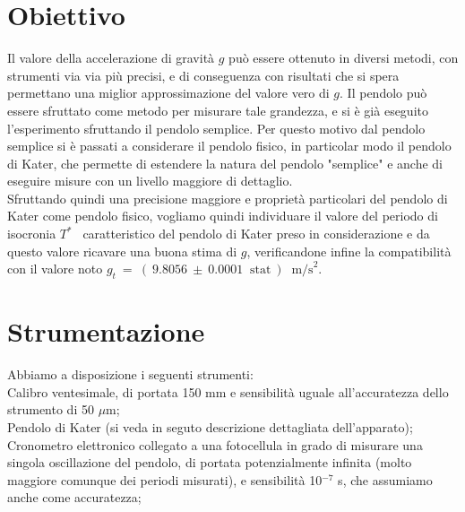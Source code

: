 \documentclass[italian, a4paper, 10pt, twocolumn]{../../style/lab_unige}
\newcommand{\gLab}{$g_t~=~(~9.8056~\pm~0.0001~\text{ stat}~)~\text{ m/s}^2$}
\newcommand{\Tiso}{$T^*$}
\begin{document}
    \section{Obiettivo}
    \label{section:aim}
    Il valore della accelerazione di gravità $g$ può essere ottenuto in diversi metodi, con strumenti via via più precisi, e di conseguenza con risultati che si spera permettano una miglior approssimazione del valore vero di $g$. Il pendolo può essere sfruttato come metodo per misurare tale grandezza, e si è già eseguito l'esperimento sfruttando il pendolo semplice. Per questo motivo dal pendolo semplice si è passati a considerare il pendolo fisico, in particolar modo il pendolo di Kater, che permette di estendere la natura del pendolo 
    "semplice" e anche di eseguire misure con un livello maggiore di dettaglio.\\
    Sfruttando quindi una precisione maggiore e proprietà particolari del pendolo di Kater come pendolo fisico, vogliamo quindi individuare il valore del periodo di isocronia \Tiso~ caratteristico del pendolo di Kater preso in considerazione e da questo valore ricavare una buona stima di $g$, verificandone infine la compatibilità con il valore noto \gLab.

    \section{Strumentazione}
    \label{section:strument}
    Abbiamo a disposizione i seguenti strumenti:\\
    Calibro ventesimale, di portata 150 mm e sensibilità uguale all'accuratezza dello strumento di 50 $\mu$m;\\
    Pendolo di Kater (si veda in seguto descrizione dettagliata dell'apparato);\\
    Cronometro elettronico collegato a una fotocellula in grado di misurare una singola oscillazione del pendolo, di portata potenzialmente infinita (molto maggiore comunque dei periodi misurati), e sensibilità 10$^{-7}$ s, che assumiamo anche come accuratezza;\\
\end{document}
